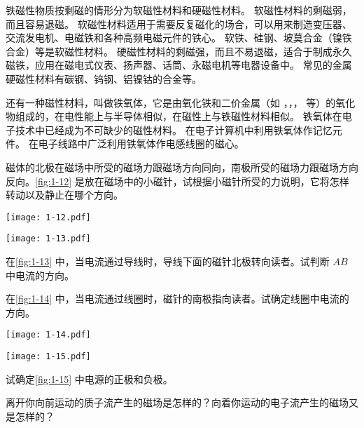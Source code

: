 铁磁性物质按剩磁的情形分为软磁性材料和硬磁性材料。
软磁性材料的剩磁弱，而且容易退磁。
软磁性材料适用于需要反复磁化的场合，可以用来制造变压器、交流发电机、电磁铁和各种高频电磁元件的铁心。
软铁、硅钢、坡莫合金（镍铁合金）等是软磁性材料。
硬磁性材料的剩磁强，而且不易退磁，适合于制成永久磁铁，应用在磁电式仪表、扬声器、话筒、永磁电机等电器设备中。
常见的金属硬磁性材料有碳钢、钨钢、铝镍钴的合金等。

还有一种磁性材料，叫做铁氧体，它是由氧化铁和二价金属（如 ，，， 等）的氧化物组成的，在电性能上与半导体相似，在磁性上与铁磁性材料相似。
铁氧体在电子技术中已经成为不可缺少的磁性材料。
在电子计算机中利用铁氧体作记忆元件。
在电子线路中广泛利用铁氧体作电感线圈的磁心。

\begin{Practice}
\begin{question}
  \item 磁体的北极在磁场中所受的磁场力跟磁场方向同向，南极所受的磁场力跟磁场方向反向。\cref{fig:1-12} 是放在磁场中的小磁针，试根据小磁针所受的力说明，它将怎样转动以及静止在哪个方向。
  \begin{figurehere}
    \begin{minipage}[b]{0.48\linewidth}\centering
      \texttt{[image: 1-12.pdf]}
      \caption{}\label{fig:1-12}
    \end{minipage}
    \begin{minipage}[b]{0.48\linewidth}\centering
      \texttt{[image: 1-13.pdf]}
      \caption{}\label{fig:1-13}
    \end{minipage}
  \end{figurehere}
  \item 在\cref{fig:1-13} 中，当电流通过导线时，导线下面的磁针北极转向读者。试判断 $AB$ 中电流的方向。
  \item 在\cref{fig:1-14} 中，当电流通过线圈时，磁针的南极指向读者。试确定线圈中电流的方向。
  \begin{figurehere}
    \begin{minipage}[b]{0.48\linewidth}\centering
      \texttt{[image: 1-14.pdf]}
      \caption{}\label{fig:1-14}
    \end{minipage}
    \begin{minipage}[b]{0.48\linewidth}\centering
      \texttt{[image: 1-15.pdf]}
      \caption{}\label{fig:1-15}
    \end{minipage}
  \end{figurehere}
  \item 试确定\cref{fig:1-15} 中电源的正极和负极。
  \item 离开你向前运动的质子流产生的磁场是怎样的？向着你运动的电子流产生的磁场又是怎样的？
\end{question}
\end{Practice}

